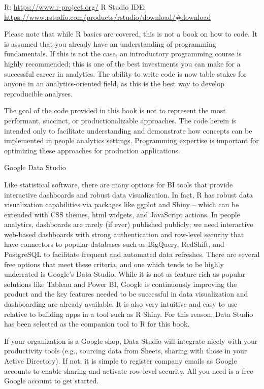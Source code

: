 \documentclass[]{book}
\begin{document}
R: \url{https://www.r-project.org/}
R Studio IDE: \url{https://www.rstudio.com/products/rstudio/download/\#download}

Please note that while R basics are covered, this is not a book on how to code. It is assumed that you already have an understanding of programming fundamentals. If this is not the case, an introductory programming course is highly recommended; this is one of the best investments you can make for a successful career in analytics. The ability to write code is now table stakes for anyone in an analytics-oriented field, as this is the best way to develop reproducible analyses.

The goal of the code provided in this book is not to represent the most performant, succinct, or productionalizable approaches. The code herein is intended only to facilitate understanding and demonstrate how concepts can be implemented in people analytics settings. Programming expertise is important for optimizing these approaches for production applications.

 Google Data Studio

Like statistical software, there are many options for BI tools that provide interactive dashboards and robust data visualization. In fact, R has robust data visualization capabilities via packages like ggplot and Shiny -- which can be extended with CSS themes, html widgets, and JavaScript actions. In people analytics, dashboards are rarely (if ever) published publicly; we need interactive web-based dashboards with strong authentication and row-level security that have connectors to popular databases such as BigQuery, RedShift, and PostgreSQL to facilitate frequent and automated data refreshes. There are several free options that meet these criteria, and one which tends to be highly underrated is Google's Data Studio. While it is not as feature-rich as popular solutions like Tableau and Power BI, Google is continuously improving the product and the key features needed to be successful in data visualization and dashboarding are already available. It is also very intuitive and easy to use relative to building apps in a tool such as R Shiny. For this reason, Data Studio has been selected as the companion tool to R for this book.

If your organization is a Google shop, Data Studio will integrate nicely with your productivity tools (e.g., sourcing data from Sheets, sharing with those in your Active Directory). If not, it is simple to register company emails as Google accounts to enable sharing and activate row-level security. All you need is a free Google account to get started.
\end{document}
